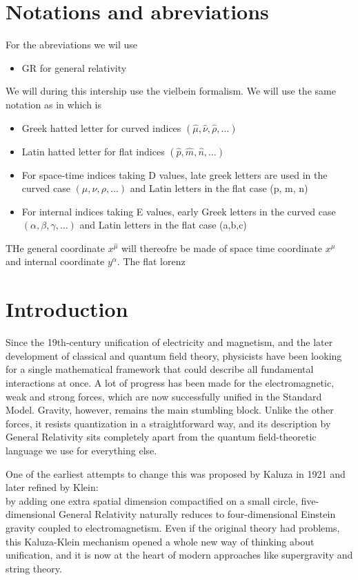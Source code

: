 \documentclass{article}
\begin{document}
\section*{Notations and abreviations}
For the abreviations we wil use
\begin{itemize}
    \item GR for general relativity
\end{itemize}
We will during this intership use the vielbein formalism. We will use the same notation as in \cite{scherk1979get}
which is
\begin{itemize}
    \item Greek hatted letter for curved indices $(\hat \mu , \hat \nu , \hat \rho , \dots)$
    \item Latin hatted letter for flat indices $(\hat p , \hat m , \hat n , \dots)$
    \item For space-time indices taking D values, late greek letters are used in the curved case $(\mu, \nu ,\rho , \dots)$ and Latin letters in the flat case (p, m, n)
    \item For internal indices  taking E values, early Greek  letters in the curved case $(\alpha, \beta ,\gamma , \dots)$ and Latin letters in the flat case (a,b,c)
\end{itemize}
THe general coordinate $x^{ \hat\mu}$ will thereofre be made of space time coordinate $x^ \mu$ and internal coordinate $y^\alpha$. The flat lorenz
\newpage

\tableofcontents
\clearpage
\section{Introduction}
Since the 19th-century unification of electricity and magnetism, 
and the later development of classical and quantum field theory, 
physicists have been looking for a single mathematical framework that could describe all fundamental interactions at once. 
A lot of progress has been made for the electromagnetic, 
weak and strong forces, which are now successfully unified in the Standard Model. Gravity, however, 
remains the main stumbling block. Unlike the other forces, it resists quantization in a straightforward way, 
and its description by General Relativity \cite{einstein1915allgemeinen} 
sits completely apart from the quantum field-theoretic language we use for everything else.

One of the earliest attempts to change this was proposed by Kaluza in 1921 
\cite{kaluza1921unitatsproblem} and later refined by Klein:\\ 
by adding one extra spatial dimension compactified on a small circle, 
five-dimensional General Relativity naturally reduces to four-dimensional Einstein gravity coupled to electromagnetism. 
Even if the original theory had problems, this Kaluza-Klein mechanism opened a whole new way of thinking about unification, 
and it is now at the heart of modern approaches like supergravity \cite{freedman2012supergravity} and string theory.
\end{document}
